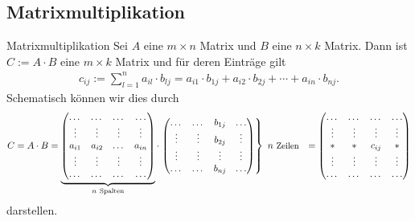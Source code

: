 \subsection{Matrixmultiplikation}
\begin{mybox}{Matrixmultiplikation}
Sei $A$ eine $ m \times n$ Matrix und $B$ eine $n \times k$ Matrix.
Dann ist $C := A \cdot B$ eine $m \times k$ Matrix und für deren Einträge gilt
\begin{align*}
c_{ij} := \sum \limits_{l = 1}^n a_{il} \cdot b_{lj}
= a_{i1} \cdot b_{1j} + a_{i2} \cdot b_{2j} + \cdots + a_{in} \cdot b_{nj}.
\end{align*}
Schematisch können wir dies durch
\begin{align*}
C = 
A \cdot B
&=
\underbrace{\begin{pmatrix}
\dots & \dots & \dots & \dots\\
\vdots & \vdots & \vdots & \vdots\\
a_{i1}& a_{i2} & \dots & a_{in}\\
\vdots & \vdots & \vdots & \vdots\\
\dots & \dots & \dots & \dots
\end{pmatrix}}_{n \ \text{Spalten}}
\cdot
\left. 
\begin{pmatrix}
\dots & \dots & b_{1j} & \dots \\
\vdots & \vdots & b_{2j} & \vdots\\
\vdots & \vdots & \vdots & \vdots\\
\dots & \dots & b_{nj} &  \dots
\end{pmatrix}
\right\rbrace \ n \ \text{\small Zeilen}
&=
\begin{pmatrix}
\dots &\dots &\dots &\dots\\
\vdots & \vdots & \vdots & \vdots\\
\ast & \ast & c_{ij} & \ast\\ 
\vdots & \vdots & \vdots & \vdots\\
\dots &\dots &\dots &\dots
\end{pmatrix}
\end{align*}
darstellen.

\end{mybox}
